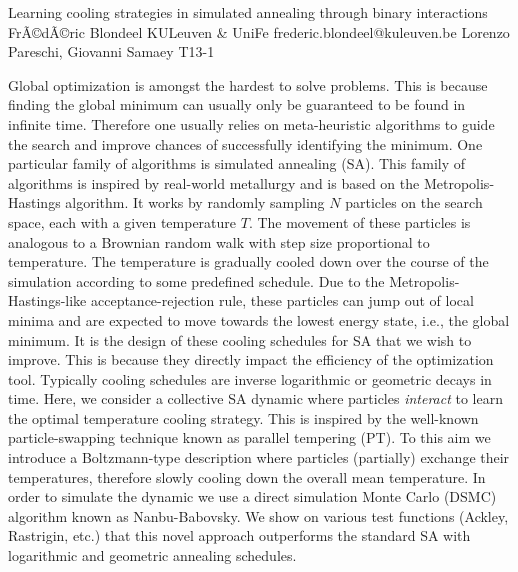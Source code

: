 \begin{talk}
  {Learning cooling strategies in simulated annealing through binary interactions}%
  {FrÃ©dÃ©ric Blondeel}%
  {KULeuven \& UniFe}%
  {frederic.blondeel@kuleuven.be}%
  {Lorenzo Pareschi, Giovanni Samaey}%
  {T13-1}%
			
Global optimization is amongst the hardest to solve problems. This is because finding the global minimum can usually only be guaranteed to be found in infinite time. Therefore one usually relies on meta-heuristic algorithms to guide the search and improve chances of successfully identifying the minimum. One particular family of algorithms is simulated annealing (SA). This family of algorithms is inspired by real-world metallurgy and is based on the Metropolis-Hastings algorithm. It works by randomly sampling $N$ particles on the search space, each with a given temperature $T$. The movement of these particles is analogous to a Brownian random walk with step size proportional to temperature. The temperature is gradually cooled down over the course of the simulation according to some predefined schedule. Due to the Metropolis-Hastings-like acceptance-rejection rule, these particles can jump out of local minima and are expected to move towards the lowest energy state, i.e., the global minimum. It is the design of these cooling schedules for SA that we wish to improve. This is because they directly impact the efficiency of the optimization tool. Typically cooling schedules are inverse logarithmic or geometric decays in time. Here, we consider a collective SA dynamic where particles \textit{interact} to learn the optimal temperature cooling strategy. This is inspired by the well-known particle-swapping technique known as parallel tempering (PT). To this aim we introduce a Boltzmann-type description where particles (partially) exchange their temperatures, therefore slowly cooling down the overall mean temperature. In order to simulate the dynamic we use a direct simulation Monte Carlo (DSMC) algorithm known as Nanbu-Babovsky. We show on various test functions (Ackley, Rastrigin, etc.) that this novel approach outperforms the standard SA with logarithmic and geometric annealing schedules.

\end{talk}

